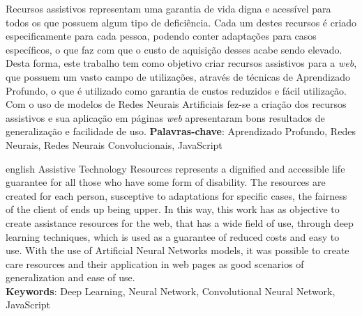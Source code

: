\setlength{\absparsep}{18pt} %
\begin{resumo}
    \par Recursos assistivos representam uma garantia de vida digna e acessível para todos os que possuem algum tipo de deficiência. Cada um destes recursos é criado especificamente para cada pessoa, podendo conter adaptações para casos específicos, o que faz com que o custo de aquisição desses acabe sendo elevado. Desta forma, este trabalho tem como objetivo criar recursos assistivos para a \textit{web}, que possuem um vasto campo de utilizações, através de técnicas de Aprendizado Profundo, o que é utilizado como garantia de custos reduzidos e fácil utilização. Com o uso de modelos de Redes Neurais Artificiais fez-se a criação dos recursos assistivos e sua aplicação em páginas \textit{web} apresentaram bons resultados de generalização e facilidade de uso.
    \vspace{\onelineskip}
    \noindent
    \textbf{Palavras-chave}: Aprendizado Profundo, Redes Neurais, Redes Neurais Convolucionais, JavaScript %
\end{resumo}

\begin{resumo}[Abstract]
    \begin{otherlanguage*}{english}
        Assistive Technology Resources represents a dignified and accessible life guarantee for all those who have some form of disability. The resources are created for each person, susceptive to adaptations for specific cases, the fairness of the client of ends up being upper. In this way, this work has as objective to create assistance resources for the web, that has a wide field of use, through deep learning techniques, which is used as a guarantee of reduced costs and easy to use. With the use of Artificial Neural Networks models, it was possible to create care resources and their application in web pages as good scenarios of generalization and ease of use.
	    \vspace{\onelineskip}
	    \noindent
	    \\
	    \textbf{Keywords}: Deep Learning, Neural Network, Convolutional Neural Network, JavaScript %
    \end{otherlanguage*}
\end{resumo}